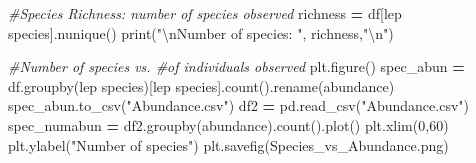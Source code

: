 \documentclass[
]{article}
\newenvironment{Shaded}{\begin{snugshade}}{\end{snugshade}}
\newcommand{\BuiltInTok}[1]{#1}
\newcommand{\CharTok}[1]{\textcolor[rgb]{0.31,0.60,0.02}{#1}}
\newcommand{\CommentTok}[1]{\textcolor[rgb]{0.56,0.35,0.01}{\textit{#1}}}
\newcommand{\DecValTok}[1]{\textcolor[rgb]{0.00,0.00,0.81}{#1}}
\newcommand{\NormalTok}[1]{#1}
\newcommand{\OperatorTok}[1]{\textcolor[rgb]{0.81,0.36,0.00}{\textbf{#1}}}
\newcommand{\StringTok}[1]{\textcolor[rgb]{0.31,0.60,0.02}{#1}}
\begin{document}
\begin{Shaded}
\begin{Highlighting}[]
\CommentTok{\#Species Richness: number of species observed }
\NormalTok{richness }\OperatorTok{=}\NormalTok{ df[}\StringTok{\textquotesingle{}lep species\textquotesingle{}}\NormalTok{].nunique()}
\BuiltInTok{print}\NormalTok{(}\StringTok{"}\CharTok{\textbackslash{}n}\StringTok{Number of species: "}\NormalTok{, richness,}\StringTok{"}\CharTok{\textbackslash{}n}\StringTok{"}\NormalTok{)}

\CommentTok{\#Number of species vs. \#of individuals observed }
\NormalTok{plt.figure()}
\NormalTok{spec\_abun }\OperatorTok{=}\NormalTok{ df.groupby(}\StringTok{\textquotesingle{}lep species\textquotesingle{}}\NormalTok{)[}\StringTok{\textquotesingle{}lep species\textquotesingle{}}\NormalTok{].count().rename(}\StringTok{\textquotesingle{}abundance\textquotesingle{}}\NormalTok{)}
\NormalTok{spec\_abun.to\_csv(}\StringTok{"Abundance.csv"}\NormalTok{)}
\NormalTok{df2 }\OperatorTok{=}\NormalTok{ pd.read\_csv(}\StringTok{"Abundance.csv"}\NormalTok{)}
\NormalTok{spec\_numabun }\OperatorTok{=}\NormalTok{ df2.groupby(}\StringTok{\textquotesingle{}abundance\textquotesingle{}}\NormalTok{).count().plot()}
\NormalTok{plt.xlim(}\DecValTok{0}\NormalTok{,}\DecValTok{60}\NormalTok{)}
\NormalTok{plt.ylabel(}\StringTok{"Number of species"}\NormalTok{)}
\NormalTok{plt.savefig(}\StringTok{\textquotesingle{}Species\_vs\_Abundance.png\textquotesingle{}}\NormalTok{)}
\end{Highlighting}
\end{Shaded}
\end{document}
